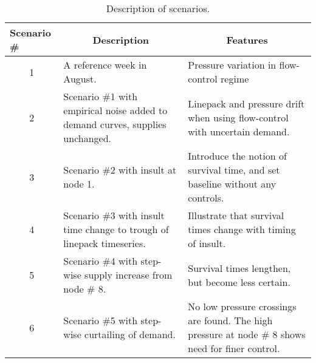 \begin{table*}
    \centering
    \begin{tabular}{|p{} | p{} | p{}|}
    \hline
    Scenario \#  &   \multicolumn{1}{c|}{Description} &   \multicolumn{1}{c|}{Features}\\
    \hline
    \multicolumn{1}{|c|}{1} & A reference week in August. & Pressure variation in flow-control regime \\ 
    \hline
    \multicolumn{1}{|c|}{2} & Scenario \#1 with empirical noise added to demand curves, supplies unchanged. & Linepack and pressure drift when using flow-control with uncertain demand.\\ 
    \hline
    \multicolumn{1}{|c|}{3} & Scenario \#2 with insult at node 1. & Introduce the notion of survival time, and set baseline without any controls.\\ 
    \hline
    \multicolumn{1}{|c|}{4} & Scenario \#3 with insult time change to trough of linepack timeseries. & Illustrate that survival times change with timing of insult.\\ 
    \hline
    \multicolumn{1}{|c|}{5} & Scenario \#4 with step-wise supply increase from node \# 8. & Survival times lengthen, but become less certain. \\
    \hline
    \multicolumn{1}{|c|}{6} & Scenario \#5 with step-wise curtailing of demand. & No low pressure crossings are found. The high pressure at node \# 8 shows need for finer control.\\
    \hline
    \end{tabular}
    \caption{Description of scenarios.}
    \label{table:scenarios}
\end{table*}
